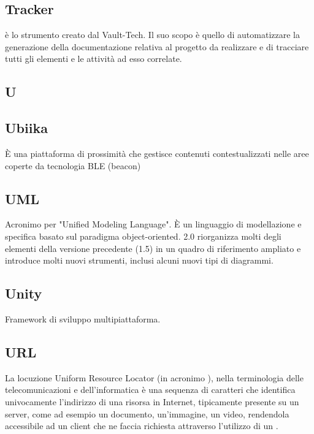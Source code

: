 \subsection*{Tracker}
 è lo strumento  creato dal  Vault-Tech. Il suo scopo è quello di automatizzare la generazione della documentazione relativa al progetto da realizzare e di tracciare tutti gli elementi e le attività ad esso correlate.

\newpage

\begin{center}
\Huge\section*{\uppercase{U}}
\end{center}

\subsection*{Ubiika}
È una piattaforma di prossimità che gestisce contenuti contestualizzati nelle
aree coperte da tecnologia BLE (beacon)​

\subsection*{UML}
Acronimo per "Unified Modeling Language". È un linguaggio di modellazione e
specifica basato sul paradigma object-oriented.  2.0 riorganizza molti degli
elementi della versione precedente (1.5) in un quadro di riferimento ampliato e
introduce molti nuovi strumenti, inclusi alcuni nuovi tipi di diagrammi.

\subsection*{Unity}
Framework di sviluppo multipiattaforma.

\subsection*{URL}
La locuzione Uniform Resource Locator (in acronimo ), nella terminologia delle telecomunicazioni e dell'informatica è una sequenza di caratteri che identifica univocamente l'indirizzo di una risorsa in Internet, tipicamente presente su un  server, come ad esempio un documento, un'immagine, un video, rendendola accessibile ad un client che ne faccia richiesta attraverso l'utilizzo di un  .

